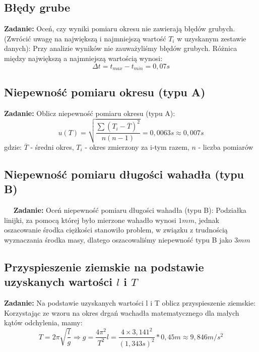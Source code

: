 \documentclass[18pt, twoside]{article}
\begin{document}
    \subsection{Błędy grube}
    \textbf{Zadanie:} Oceń, czy wyniki pomiaru okresu nie zawierają błędów grubych. (Zwrócić uwagę na największą 
    i najmniejszą wartość \(T_i\) w uzyskanym zestawie danych):\newline
    Przy analizie wyników nie zauważyliśmy błędów grubych. Różnica między największą a najmniejszą wartością wynosi: \[\Delta t = t_{max} - t_{min} = 0,07s \]
    
    \subsection{Niepewność pomiaru okresu (typu A)}
    \textbf{Zadanie:} Oblicz niepewność pomiaru okresu (typu A): \newline
    \[u(T) =\sqrt{\frac{\sum{(T_i - \overline T)^2}}{n(n-1)}} = 0,0063s \approx 0,007s \] gdzie:  \(\overline T\) - średni okres, \(T_i\) - okres zmierzony za i-tym razem, \(n\) - liczba pomiarów
    
    \subsection{Niepewność pomiaru długości wahadła (typu B)}
    \textbf{Zadanie:} Oceń niepewność pomiaru długości wahadła (typu B):\newline 
    Podziałka linijki, za pomocą której było mierzone wahadło wynosi \(1mm\), jednak oszacowanie środka ciężkości stanowiło problem, w związku z trudnością wyznaczania środka masy, dlatego oszacowaliśmy niepewność typu B jako \(3mm\)
    
    \subsection{Przyspieszenie ziemskie  na podstawie uzyskanych wartości \(l\) i \(T\)}
    \textbf{Zadanie:} Na podstawie uzyskanych wartości l i T oblicz przyspieszenie ziemskie:\newline
    Korzystając ze wzoru na okres drgań wachadła matematycznego dla małych kątów odchylenia, mamy: \[T = 2\pi \sqrt{\frac{l}{g}} \Rightarrow g = \frac{4\pi^2}{T^2}l = \frac{4 \times 3,141^2}{(1,343s)^2} * 0,45m  \approx 9,846 m/s^2\]
    
\end{document}
